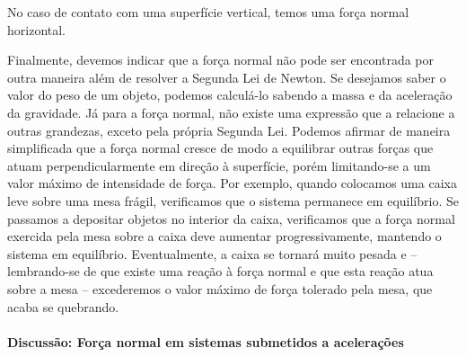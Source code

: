 \begin{marginfigure}
\centering
{}
\caption{No caso de contato com uma superfície vertical, temos uma força normal horizontal.}
\end{marginfigure}

Finalmente, devemos indicar que a força normal não pode ser encontrada por outra maneira além de resolver a Segunda Lei de Newton. Se desejamos saber o valor do peso de um objeto, podemos calculá-lo sabendo a massa e da aceleração da gravidade. Já para a força normal, não existe uma expressão que a relacione a outras grandezas, exceto pela própria Segunda Lei. Podemos afirmar de maneira simplificada que a força normal cresce de modo a equilibrar outras forças que atuam perpendicularmente em direção à superfície, porém limitando-se a um valor máximo de intensidade de força. Por exemplo, quando colocamos uma caixa leve sobre uma mesa frágil, verificamos que o sistema permanece em equilíbrio. Se passamos a depositar objetos no interior da caixa, verificamos que a força normal exercida pela mesa sobre a caixa deve aumentar progressivamente, mantendo o sistema em equilíbrio. Eventualmente, a caixa se tornará muito pesada e -- lembrando-se de que existe uma reação à força normal e que esta reação atua sobre a mesa -- excederemos o valor máximo de força tolerado pela mesa, que acaba se quebrando.

\paragraph{Discussão: Força normal em sistemas submetidos a acelerações}

